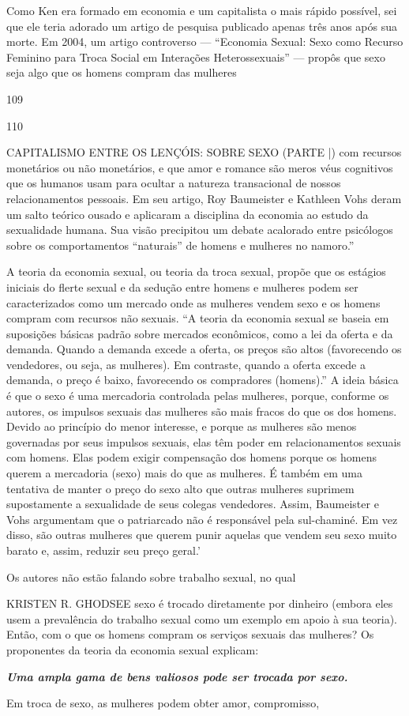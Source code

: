  \par 
Como Ken era formado em economia e um capitalista o mais rápido possível, sei que ele teria adorado um artigo de pesquisa publicado apenas três anos após sua morte. Em 2004, um artigo controverso — “Economia Sexual: Sexo como Recurso Feminino para Troca Social em Interações Heterossexuais” — propôs que sexo seja algo que os homens compram das mulheres
 \par 
109
 \par 
110
 \par 
CAPITALISMO ENTRE OS LENÇÓIS: SOBRE SEXO (PARTE |) com recursos monetários ou não monetários, e que amor e romance são meros véus cognitivos que os humanos usam para ocultar a natureza transacional de nossos relacionamentos pessoais. Em seu artigo, Roy Baumeister e Kathleen Vohs deram um salto teórico ousado e aplicaram a disciplina da economia ao estudo da sexualidade humana. Sua visão precipitou um debate acalorado entre psicólogos sobre os comportamentos “naturais” de homens e mulheres no namoro.”
 \par 
A teoria da economia sexual, ou teoria da troca sexual, propõe que os estágios iniciais do flerte sexual e da sedução entre homens e mulheres podem ser caracterizados como um mercado onde as mulheres vendem sexo e os homens compram com recursos não sexuais. “A teoria da economia sexual se baseia em suposições básicas padrão sobre mercados econômicos, como a lei da oferta e da demanda. Quando a demanda excede a oferta, os preços são altos (favorecendo os vendedores, ou seja, as mulheres). Em contraste, quando a oferta excede a demanda, o preço é baixo, favorecendo os compradores (homens).” A ideia básica é que o sexo é uma mercadoria controlada pelas mulheres, porque, conforme os autores, os impulsos sexuais das mulheres são mais fracos do que os dos homens. Devido ao princípio do menor interesse, e porque as mulheres são menos governadas por seus impulsos sexuais, elas têm poder em relacionamentos sexuais com homens. Elas podem exigir compensação dos homens porque os homens querem a mercadoria (sexo) mais do que as mulheres. É também em uma tentativa de manter o preço do sexo alto que outras mulheres suprimem supostamente a sexualidade de seus colegas vendedores. Assim, Baumeister e Vohs argumentam que o patriarcado não é responsável pela sul-chaminé. Em vez disso, são outras mulheres que querem punir aquelas que vendem seu sexo muito barato e, assim, reduzir seu preço geral.’
 \par 
Os autores não estão falando sobre trabalho sexual, no qual
 \par 
KRISTEN R. GHODSEE sexo é trocado diretamente por dinheiro (embora eles usem a prevalência do trabalho sexual como um exemplo em apoio à sua teoria). Então, com o que os homens compram os serviços sexuais das mulheres? Os proponentes da teoria da economia sexual explicam:
 \par 
\textit\textbf{ {Uma ampla gama de bens valiosos pode ser trocada por sexo.} }
 \par 
Em troca de sexo, as mulheres podem obter amor, compromisso,
 \par 
